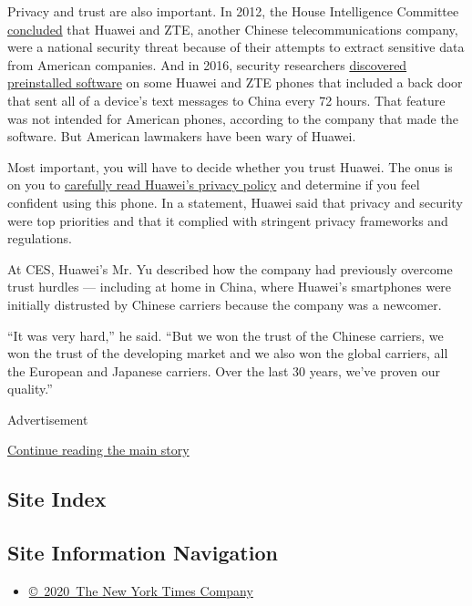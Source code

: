 Privacy and trust are also important. In 2012, the House Intelligence
Committee
\href{http://www.nytimes.com/2012/10/09/us/us-panel-calls-huawei-and-zte-national-security-threat.html}{concluded}
that Huawei and ZTE, another Chinese telecommunications company, were a
national security threat because of their attempts to extract sensitive
data from American companies. And in 2016, security researchers
\href{https://www.nytimes.com/2016/11/16/us/politics/china-phones-software-security.html}{discovered
preinstalled software} on some Huawei and ZTE phones that included a
back door that sent all of a device's text messages to China every 72
hours. That feature was not intended for American phones, according to
the company that made the software. But American lawmakers have been
wary of Huawei.

Most important, you will have to decide whether you trust Huawei. The
onus is on you to
\href{https://consumer.huawei.com/en/legal/privacy-policy/}{carefully
read Huawei's privacy policy} and determine if you feel confident using
this phone. In a statement, Huawei said that privacy and security were
top priorities and that it complied with stringent privacy frameworks
and regulations.

At CES, Huawei's Mr. Yu described how the company had previously
overcome trust hurdles --- including at home in China, where Huawei's
smartphones were initially distrusted by Chinese carriers because the
company was a newcomer.

``It was very hard,'' he said. ``But we won the trust of the Chinese
carriers, we won the trust of the developing market and we also won the
global carriers, all the European and Japanese carriers. Over the last
30 years, we've proven our quality.''

Advertisement

\protect\hyperlink{after-bottom}{Continue reading the main story}

\hypertarget{site-index}{%
\subsection{Site Index}\label{site-index}}

\hypertarget{site-information-navigation}{%
\subsection{Site Information
Navigation}\label{site-information-navigation}}

\begin{itemize}
\tightlist
\item
  \href{https://help.nytimes.com/hc/en-us/articles/115014792127-Copyright-notice}{©~2020~The
  New York Times Company}
\end{itemize}

